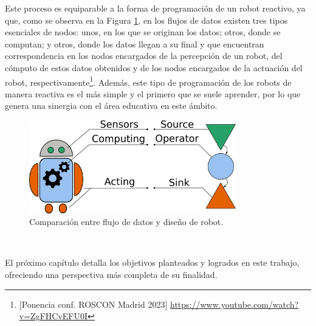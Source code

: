 Este proceso es equiparable a la forma de programación de un robot reactivo, ya
que, como se observa en la Figura \ref{fig:data_flow_vs_robotics}, en los flujos
de datos existen tres tipos esenciales de nodos: unos, en los que se originan
los datos; otros, donde se computan; y otros, donde los datos llegan a su final
y que encuentran correspondencia en los nodos encargados de la percepción de un
robot, del cómputo de estos datos obtenidos y de los nodos encargados de la
actuación del robot, respectivamente\footnote{[Ponencia conf. ROSCON
Madrid 2023] \url{https://www.youtube.com/watch?v=ZgFHCvEFU0I}}.
Además, este tipo de programación de los robots de manera reactiva es el más
simple y el primero que se suele aprender, por lo que genera una sinergia con el
área educativa en este ámbito.

\begin{figure} [h!]
  \begin{center}
    \includegraphics[width=9cm]{figs/data-flow_vs_robotics_scheme}
  \end{center}
  \caption{Comparación entre flujo de datos y diseño de robot.}
  \label{fig:data_flow_vs_robotics}
\end{figure}\



El próximo capítulo detalla los objetivos planteados y logrados en este trabajo,
ofreciendo una perspectiva más completa de su finalidad.
